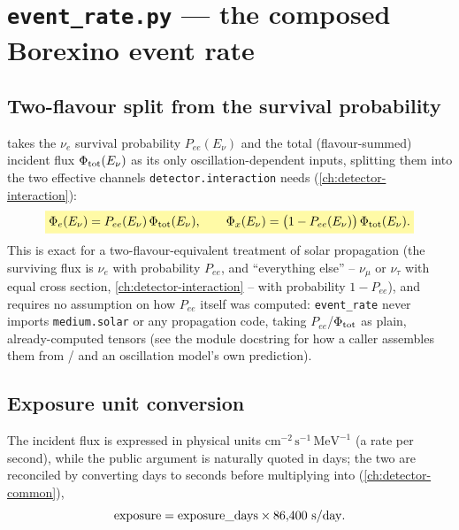 \section{\texttt{event\_rate.py} --- the composed Borexino event rate}


\begin{theorybox}
\subsection*{Two-flavour split from the survival probability}
 takes the $\nu_e$ survival probability $P_{ee}(E_\nu)$
and the total (flavour-summed) incident flux $\Phi_{\rm tot}(E_\nu)$ as its
only oscillation-dependent inputs, splitting them into the two effective
channels \texttt{detector.interaction} needs
(\cref{ch:detector-interaction}):
\begin{equation}
  \keyresult{\Phi_e(E_\nu) = P_{ee}(E_\nu)\,\Phi_{\rm tot}(E_\nu),
    \qquad
    \Phi_x(E_\nu) = \bigl(1-P_{ee}(E_\nu)\bigr)\,\Phi_{\rm tot}(E_\nu).}
\end{equation}
This is exact for a two-flavour-equivalent treatment of solar propagation
(the surviving flux is $\nu_e$ with probability $P_{ee}$, and
``everything else'' -- $\nu_\mu$ or $\nu_\tau$ with equal cross section,
\cref{ch:detector-interaction} -- with probability $1-P_{ee}$), and requires
no assumption on how $P_{ee}$ itself was computed: \texttt{event\_rate}
never imports \texttt{medium.solar} or any propagation code, taking
$P_{ee}$/$\Phi_{\rm tot}$ as plain, already-computed tensors (see the module
docstring for how a caller assembles them from
/ and an
oscillation model's own prediction).

\subsection*{Exposure unit conversion}
The incident flux is expressed in physical units
$\mathrm{cm^{-2}\,s^{-1}\,MeV^{-1}}$ (a rate per second), while the public
 argument is naturally quoted in days; the two are
reconciled by converting days to seconds before multiplying into
 (\cref{ch:detector-common}),
\begin{equation}
  {\rm exposure} = {\rm exposure\_days}\times86{,}400\ \mathrm{s/day}.
\end{equation}
\end{theorybox}

